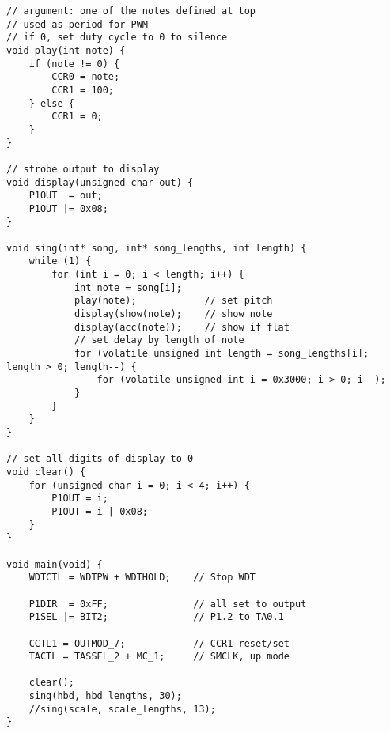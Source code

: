 \documentclass[letterpaper]{article}
\begin{document}
\begin{verbatim}
// argument: one of the notes defined at top
// used as period for PWM
// if 0, set duty cycle to 0 to silence
void play(int note) {
    if (note != 0) {
        CCR0 = note;
        CCR1 = 100;
    } else {
        CCR1 = 0;
    }
}

// strobe output to display
void display(unsigned char out) {
    P1OUT  = out;
    P1OUT |= 0x08;
}

void sing(int* song, int* song_lengths, int length) {
    while (1) {
        for (int i = 0; i < length; i++) {
            int note = song[i];
            play(note);            // set pitch
            display(show(note);    // show note
            display(acc(note));    // show if flat
            // set delay by length of note
            for (volatile unsigned int length = song_lengths[i]; length > 0; length--) {
                for (volatile unsigned int i = 0x3000; i > 0; i--);
            }
        }
    }
}

// set all digits of display to 0
void clear() {
    for (unsigned char i = 0; i < 4; i++) {
        P1OUT = i;
        P1OUT = i | 0x08;
    }
}

void main(void) {
    WDTCTL = WDTPW + WDTHOLD;    // Stop WDT
    
    P1DIR  = 0xFF;               // all set to output
    P1SEL |= BIT2;               // P1.2 to TA0.1
    
    CCTL1 = OUTMOD_7;            // CCR1 reset/set
    TACTL = TASSEL_2 + MC_1;     // SMCLK, up mode
    
    clear();
    sing(hbd, hbd_lengths, 30);
    //sing(scale, scale_lengths, 13);
}
		\end{verbatim}
\end{document}
